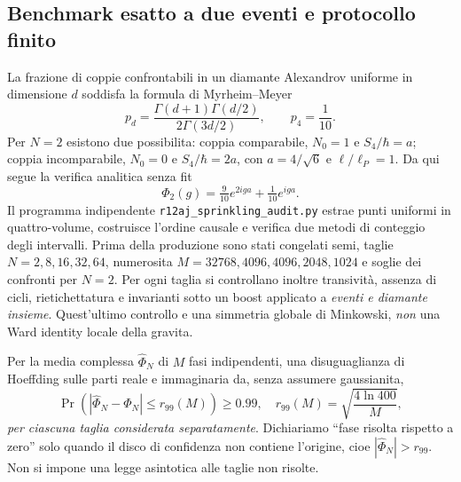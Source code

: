 \documentclass[11pt,a4paper]{article}
\begin{document}
\subsection{Benchmark esatto a due eventi e protocollo finito}

La frazione di coppie confrontabili in un diamante Alexandrov uniforme in dimensione $d$ soddisfa la formula di Myrheim--Meyer \cite{Surya2019Review}
\begin{equation}
 p_d=\frac{\Gamma(d+1)\Gamma(d/2)}{2\Gamma(3d/2)},
 \qquad p_4=\frac1{10}.
 \label{eq:r12aj_comparable}
\end{equation}
Per $N=2$ esistono due possibilita: coppia comparabile, $N_0=1$ e $S_4/\hbar=a$; coppia incomparabile, $N_0=0$ e $S_4/\hbar=2a$, con $a=4/\sqrt6$ e $\ell/\ell_P=1$. Da qui segue la verifica analitica senza fit
\begin{equation}
 \boxed{\Phi_2(g)=\tfrac9{10}e^{2iga}+\tfrac1{10}e^{iga}.}
 \label{eq:r12aj_phi2}
\end{equation}
Il programma indipendente \texttt{r12aj\_sprinkling\_audit.py} estrae punti uniformi in quattro-volume, costruisce l'ordine causale e verifica due metodi di conteggio degli intervalli. Prima della produzione sono stati congelati semi, taglie $N=2,8,16,32,64$, numerosita $M=32768,4096,4096,2048,1024$ e soglie dei confronti per $N=2$. Per ogni taglia si controllano inoltre transivit\`a, assenza di cicli, rietichettatura e invarianti sotto un boost applicato a \emph{eventi e diamante insieme}. Quest'ultimo controllo e una simmetria globale di Minkowski, \emph{non} una Ward identity locale della gravita.

Per la media complessa $\widehat\Phi_N$ di $M$ fasi indipendenti, una disuguaglianza di Hoeffding sulle parti reale e immaginaria da, senza assumere gaussianita,
\begin{equation}
 \Pr\!\left(\left|\widehat\Phi_N-\Phi_N\right|\le r_{99}(M)\right)\ge0.99,
 \quad r_{99}(M)=\sqrt{\frac{4\ln 400}{M}},
 \label{eq:r12aj_hoeffding}
\end{equation}
\emph{per ciascuna taglia considerata separatamente}. Dichiariamo ``fase risolta rispetto a zero'' solo quando il disco di confidenza non contiene l'origine, cioe $|\widehat\Phi_N|>r_{99}$. Non si impone una legge asintotica alle taglie non risolte.
\end{document}
